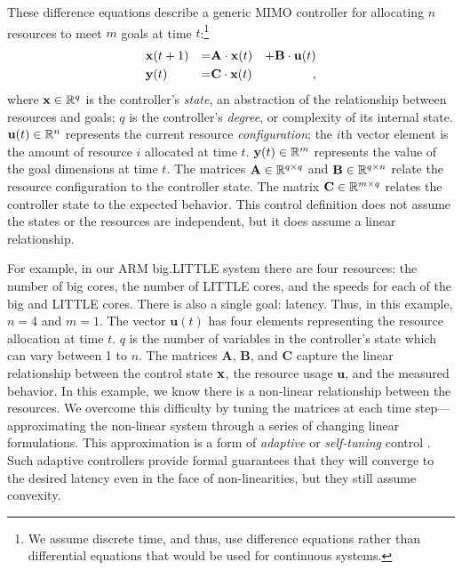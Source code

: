 These difference equations describe a generic MIMO controller for
allocating $n$ resources to meet $m$ goals at time $t$:\footnote{We
  assume discrete time, and thus, use difference equations rather than
  differential equations that would be used for continuous systems.}
\begin{equation}
\begin{aligned}
&\mathbf{x}(t+1) &=& \mathbf{A} \cdot \mathbf{x}(t)& + \mathbf{B} \cdot \mathbf{u}(t)\\
&\mathbf{y}(t)   &=& \mathbf{C} \cdot \mathbf{x}(t)&,
\end{aligned}
\label{eqn:system:mimo}
\end{equation}
where $\mathbf{x} \in \mathbb{R}^{q}$ is the controller's \emph{state}, an abstraction
of the relationship between resources and goals; $q$ is the
controller's \emph{degree}, or complexity of its internal state.
$\mathbf{u}(t) \in \mathbb{R}^n$ represents the current resource
\emph{configuration}; \ie{} the $i$th vector element is the amount of
resource $i$ allocated at time $t$.  $\mathbf{y}(t) \in \mathbb{R}^{m}$ represents the
value of the goal dimensions at time $t$. The matrices $\mathbf{A} \in
\mathbb{R}^{q \times q}$ and $\mathbf{B} \in \mathbb{R}^{q \times n}$ relate the
resource configuration to the controller state.  The matrix
$\mathbf{C} \in \mathbb{R}^{m \times q}$ relates the controller state to the
expected behavior.  This control definition does not assume the states
or the resources are independent, but it does assume a linear
relationship.

For example, in our ARM big.LITTLE system there are four resources:
the number of big cores, the number of LITTLE cores, and the speeds
for each of the big and LITTLE cores.  There is also a single goal:
latency.  Thus, in this example, $n=4$ and $m=1$. The vector
$\mathbf{u}(t)$ has four elements representing the resource allocation
at time $t$. $q$ is the number of variables in the controller's state
which can vary between 1 to $n$.  The matrices $\mathbf{A}$,
$\mathbf{B}$, and $\mathbf{C}$ capture the linear relationship between
the control state $\mathbf{x}$, the resource usage $\mathbf{u}$, and the
measured behavior.  In this example, we know there is a non-linear
relationship between the resources.  We overcome this difficulty by
tuning the matrices at each time step---approximating the non-linear
system through a series of changing linear formulations.  This
approximation is a form of \emph{adaptive} or \emph{self-tuning}
control \cite{HandbookControl}.  Such adaptive controllers provide
formal guarantees that they will converge to the desired latency
even in the face of non-linearities, but they still assume convexity.

